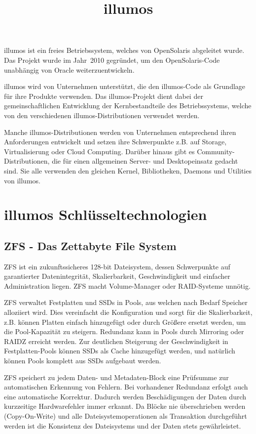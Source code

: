 \documentclass[11pt,foldmark,notumble]{leaflet}
\title{\bf illumos}
\begin{document}
\vspace*{4cm}
illumos ist ein freies Betriebssystem, welches von OpenSolaris
abgeleitet wurde. Das Projekt wurde im Jahr~2010 gegründet, um
den OpenSolaris-Code unabhängig von Oracle weiterzuentwickeln.

illumos wird von Unternehmen unterstützt, die den illumos-Code als
Grundlage für ihre Produkte verwenden. Das illumos-Projekt dient dabei
der gemeinschaftlichen Entwicklung der Kernbestandteile des
Betriebssystems, welche von den verschiedenen illumos-Distributionen
verwendet werden.

Manche illumos-Distributionen werden von Unternehmen entsprechend
ihren Anforderungen entwickelt und setzen ihre Schwerpunkte z.B. auf
Storage, Virtualisierung oder Cloud Computing. Darüber hinaus gibt
es Community-Distributionen, die für einen allgemeinen Server- und
Desktopeinsatz gedacht sind. Sie alle verwenden den gleichen Kernel,
Bibliotheken, Daemons und Utilities von illumos.


\section{illumos Schlüsseltechnologien}
\subsection{ZFS - Das Zettabyte File System}
ZFS ist ein zukunftssicheres 128-bit Dateisystem, dessen Schwerpunkte
auf garantierter Datenintegrität, Skalierbarkeit, Geschwindigkeit und
einfacher Administration liegen. ZFS macht Volume-Manager oder
RAID-Systeme unnötig.

ZFS verwaltet Festplatten und SSDs in Pools, aus welchen nach Bedarf
Speicher alloziiert wird. Dies vereinfacht die Konfiguration und sorgt
für die Skalierbarkeit, z.B. können Platten einfach hinzugefügt oder
durch Größere ersetzt werden, um die Pool-Kapazität zu steigern.
Redundanz kann in Pools durch Mirroring oder RAIDZ erreicht werden.
Zur deutlichen Steigerung der Geschwindigkeit in Festplatten-Pools
können SSDs als Cache hinzugefügt werden, und natürlich können Pools
komplett aus SSDs aufgebaut werden.

ZFS speichert zu jedem Daten- und Metadaten-Block eine Prüfsumme zur
automatischen Erkennung von Fehlern. Bei vorhandener Redundanz erfolgt
auch eine automatische Korrektur. Dadurch werden Beschädigungen der
Daten durch kurzzeitige Hardwarefehler immer erkannt. Da Blöcke nie
überschrieben werden (Copy-On-Write) und alle Dateisystemoperationen
als Transaktion durchgeführt werden ist die Konsistenz des
Dateisystems und der Daten stets gewährleistet.
\end{document}
